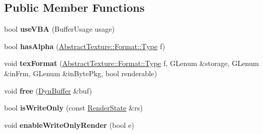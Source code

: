 \subsection*{Public Member Functions}
\begin{DoxyCompactItemize}
\item 
\hypertarget{struct_tempest_1_1_opengl2x_1_1_device_aefdabdf2a5fb6ae2db409755fae44116}{bool {\bfseries use\+V\+B\+A} (Buffer\+Usage usage)}\label{struct_tempest_1_1_opengl2x_1_1_device_aefdabdf2a5fb6ae2db409755fae44116}

\item 
\hypertarget{struct_tempest_1_1_opengl2x_1_1_device_a45fbf073f21d16f5cef4e9970143b570}{bool {\bfseries has\+Alpha} (\hyperlink{struct_tempest_1_1_abstract_texture_1_1_format_a231a1f516e53783bf72c713669b115b3}{Abstract\+Texture\+::\+Format\+::\+Type} f)}\label{struct_tempest_1_1_opengl2x_1_1_device_a45fbf073f21d16f5cef4e9970143b570}

\item 
\hypertarget{struct_tempest_1_1_opengl2x_1_1_device_aa6de2ecb68026624c39cd94beef859d4}{void {\bfseries tex\+Format} (\hyperlink{struct_tempest_1_1_abstract_texture_1_1_format_a231a1f516e53783bf72c713669b115b3}{Abstract\+Texture\+::\+Format\+::\+Type} f, G\+Lenum \&storage, G\+Lenum \&in\+Frm, G\+Lenum \&in\+Byte\+Pkg, bool renderable)}\label{struct_tempest_1_1_opengl2x_1_1_device_aa6de2ecb68026624c39cd94beef859d4}

\item 
\hypertarget{struct_tempest_1_1_opengl2x_1_1_device_a0d184aabc63ff01cdbbcab1b7a414bb0}{void {\bfseries free} (\hyperlink{struct_tempest_1_1_opengl2x_1_1_device_1_1_dyn_buffer}{Dyn\+Buffer} \&buf)}\label{struct_tempest_1_1_opengl2x_1_1_device_a0d184aabc63ff01cdbbcab1b7a414bb0}

\item 
\hypertarget{struct_tempest_1_1_opengl2x_1_1_device_a0f3b5fb76e2a93e7284312269e2d7ce4}{bool {\bfseries is\+Write\+Only} (const \hyperlink{class_tempest_1_1_render_state}{Render\+State} \&rs)}\label{struct_tempest_1_1_opengl2x_1_1_device_a0f3b5fb76e2a93e7284312269e2d7ce4}

\item 
\hypertarget{struct_tempest_1_1_opengl2x_1_1_device_ab90a9685555d25042abd93e9518b5dd8}{void {\bfseries enable\+Write\+Only\+Render} (bool e)}\label{struct_tempest_1_1_opengl2x_1_1_device_ab90a9685555d25042abd93e9518b5dd8}

\end{DoxyCompactItemize}
